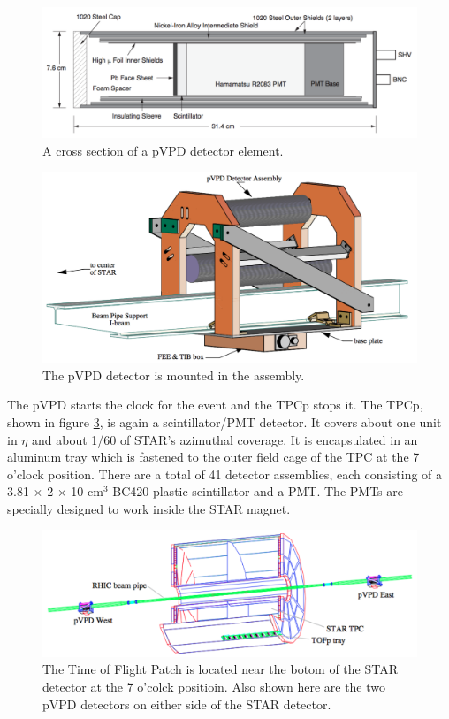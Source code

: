 \documentclass[abstract = on,listof=totoc, bibliography=totoc]{scrreprt}
\begin{document}
\begin{figure}
\begin{center}
\includegraphics[width = .8\textwidth]{vpdDetector}
\caption[pVPD detector element]{A cross section of a pVPD detector element.}
\label{fig:vpdDetector}
\end{center}
\end{figure}

\begin{figure}
\begin{center}
\includegraphics[width = .6\textwidth]{vpdAssembly}
\caption[pVPD Assembly]{The pVPD detector is mounted in the assembly.}
\label{fig:vpdAssembly}
\end{center}
\end{figure}

The pVPD starts the clock for the event and the TPCp stops it. The TPCp, shown in figure \ref{fig:starToF}, is again a scintillator/PMT detector. It covers about one unit in $\eta$ and about 1/60 of STAR's azimuthal coverage. It is encapsulated in an aluminum tray which is fastened to the outer field cage of the TPC at the 7 o'clock position. There are a total of 41 detector assemblies, each consisting of a 3.81 $\times$ 2 $\times$ 10 cm$^3$ BC420 plastic scintillator and a PMT. The PMTs are specially designed to work inside the STAR magnet.\cite{TOFppVPD}




\begin{figure}
\begin{center}
\includegraphics[width = .9\textwidth]{starToF}
\caption[STAR Time of Flight System]{The Time of Flight Patch is located near the botom of the STAR detector at the 7 o'colck positioin. Also shown here are the two pVPD detectors on either side of the STAR detector.}
\label{fig:starToF}
\end{center}
\end{figure}
\end{document}
